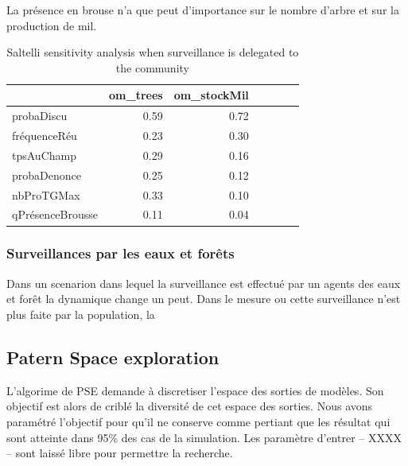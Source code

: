 \documentclass{article}
\begin{document}
        La présence en brouse n'a que peut d'importance sur le nombre d'arbre et sur la production de mil. 

        \begin{table}
            \centering\begingroup\fontsize{10}{12}\selectfont
            
                \begin{tabular}[]{lrrrrrr}
                    \toprule
                    ~ & om\_trees & om\_stockMil\\
                    \hline
                    \addlinespace
                    probaDiscu & 0.59 & 0.72\\
                    fréquenceRéu & 0.23 & 0.30\\
                    tpsAuChamp & 0.29 & 0.16\\
                    probaDenonce & 0.25 & 0.12\\
                    nbProTGMax & 0.33 & 0.10\\
                    qPrésenceBrousse & 0.11 & 0.04\\
                    \bottomrule
                \end{tabular}
            \caption{Saltelli sensitivity analysis when surveillance is delegated to the community}
            \label{tab:saltelliCom}
            \endgroup{}
        \end{table}

    \subsubsection{Surveillances par les eaux et forêts}

        Dans un scenarion dans lequel la surveillance est effectué par un agents des eaux et forêt la dynamique change un peut. Dans le mesure ou cette surveillance n'est plus faite par la population, la 

    \subsection{Patern Space exploration}

    L'algorime de PSE demande à discretiser l'espace des sorties de modèles. Son objectif est alors de criblé la diversité de cet espace des sorties. Nous avons paramétré l'objectif pour qu'il ne conserve comme pertiant que les résultat qui sont atteinte dans 95\% des cas de la simulation. Les paramètre d'entrer -- XXXX -- sont laissé libre pour permettre la recherche.\\
    
\end{document}
